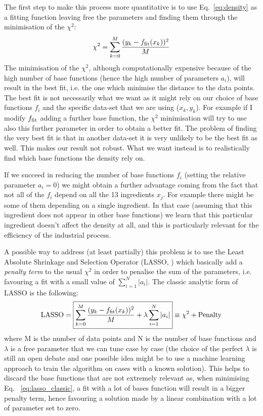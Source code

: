 \documentclass[11pt]{article}
\begin{document}
The first step to make this process more quantitative is to use Eq.~\ref{eq:density} as a fitting function leaving free the parameters and finding them through the minimisation of the $\chi^2$:
\begin{equation}
\label{eq:chisquared}
\chi^2=\sum_{k=0}^M\frac{(y_k - f_{\rm{fit}}(x_k))^2}{M}
\end{equation}
The minimisation of the $\chi^2$, although computationally expensive because of the high number of base functions (hence the high number of parameters $a_i$), will result in the best fit, i.e. the one which minimise the distance to the data points. The best fit is not necessarily what we want as it might rely on our choice of base functions $f_i$ and the specific data-set that we are using ($x_k,y_k$). For example if I modify $f_{\rm{fit}}$ adding a further base function, the $\chi^2$ minimisation will try to use also this further parameter in order to obtain a better fit. The problem of finding the very best fit is that in another data-set it is very unlikely to be the best fit as well. This makes our result not robust.  What we want instead is to realistically find which base functions the density rely on. 

If we succeed in reducing the number of base functions $f_i$ (setting the relative parameter $a_i=0$) we might obtain a further advantage coming from the fact that not all of the $f_i$ depend on all the 13 ingredients $x_j$. For example there might be some of them depending on a single ingredient. In that case (assuming that this ingredient does not appear in other base functions) we learn that this particular ingredient doesn't affect the density at all, and this is particularly relevant for the efficiency of the industrial process.

A possible way to address (at least partially) this problem is to use the Least Absolute Shrinkage and Selection Operator (LASSO, \citealt{LASSO}) which basically add a \textit{penalty term} to the usual $\chi^2$ in order to penalise the sum of the parameters, i.e. favouring a fit with a small value of $\sum_{i=1}^N \lvert  a_i \rvert$. The classic analytic form of LASSO is the following: 
%
\begin{equation}
\label{eq:lasso_classic}
\rm{LASSO} = \boxed{ \sum_{k=0}^M\frac{(y_k - f_{\rm{fit}}(x_k))^2}{M} + \lambda\sum_{i=1}^N {\lvert} a_i {\rvert}} \equiv \chi^2 + \rm{Penalty}
\end{equation}
%
where M is the number of data points and N is the number of base functions and $\lambda$ is a free parameter that we can tune case by case (the choice of the perfect $\lambda$ is still an open debate and one possible idea might be to use a machine learning approach to train the algorithm on cases with a known solution). This helps to discard the base functions that are not extremely relevant as, when minimising Eq. ~\ref{eq:lasso_classic}, a fit with a lot of bases function will result in a bigger penalty term, hence favouring a solution made by a linear combination with a lot of parameter set to zero.
\end{document}
